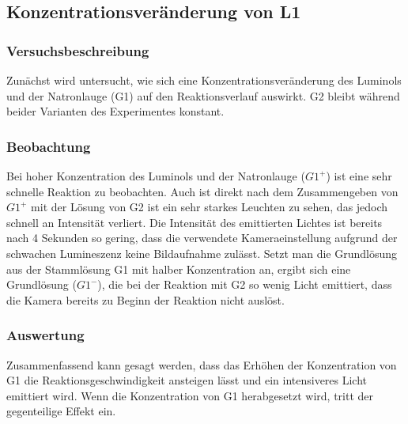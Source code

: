 \subsection{Konzentrationsveränderung von L1} 

\subsubsection{Versuchsbeschreibung}

Zunächst wird untersucht, wie sich eine Konzentrationsveränderung des Luminols und der Natronlauge (G1) auf den Reaktionsverlauf auswirkt. G2 bleibt während beider Varianten des Experimentes konstant. 

\subsubsection{Beobachtung}

Bei hoher Konzentration des Luminols und der Natronlauge ($G1^+$) ist eine sehr schnelle Reaktion zu beobachten. Auch ist direkt nach dem Zusammengeben von $G1^+$ mit der Lösung von G2 ist ein sehr starkes Leuchten zu sehen, das jedoch schnell an Intensität verliert. Die Intensität des emittierten Lichtes ist bereits nach 4 Sekunden so gering, dass die verwendete Kameraeinstellung aufgrund der schwachen Lumineszenz keine Bildaufnahme zulässt. Setzt man die Grundlösung aus der Stammlösung G1 mit halber Konzentration an, ergibt sich eine Grundlösung ($G1^-$), die bei der Reaktion mit G2 so wenig Licht emittiert, dass die Kamera bereits zu Beginn der Reaktion nicht auslöst.

\subsubsection{Auswertung}

Zusammenfassend kann gesagt werden, dass das Erhöhen der Konzentration von G1 die Reaktionsgeschwindigkeit ansteigen lässt und ein intensiveres Licht emittiert wird. Wenn die Konzentration von G1 herabgesetzt wird, tritt der gegenteilige Effekt ein.
